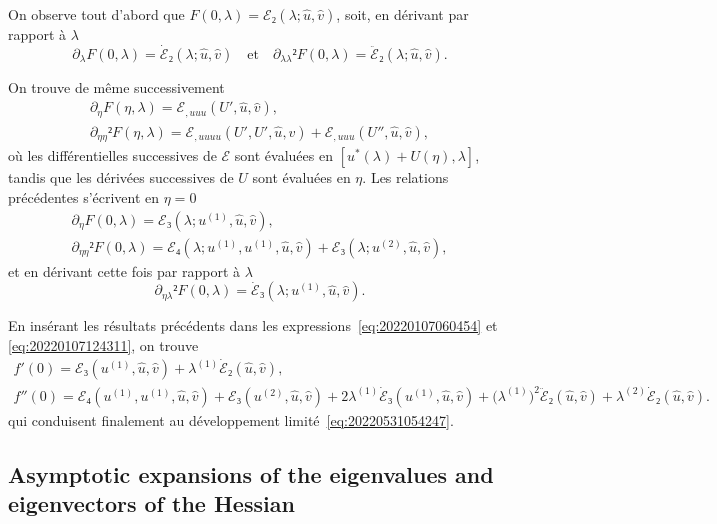 \documentclass[12pt, final]{scrartcl}
\theoremstyle{definition}
\newcommand{\order}[2][1]{#2^{(#1)}}
\begin{document}
On observe tout d'abord que \(F(0, λ) =ℰ₂(λ; \hat{u}, \hat{v})\), soit, en
dérivant par rapport à \(λ\)
\begin{equation*}
  ∂_{λ} F(0, λ) = \dot{ℰ}₂(λ; \hat{u}, \hat{v})
  \quad \text{et} \quad
  ∂_{λλ}² F(0, λ) = \ddot{ℰ}₂(λ; \hat{u}, \hat{v}).
\end{equation*}

On trouve de même successivement
\begin{gather*}
  ∂_{η} F(η, λ) = ℰ_{, uuu}(U', \hat{u}, \hat{v}),\\
  ∂_{ηη}² F(η, λ) = ℰ_{, uuuu}(U', U', \hat{u}, \hat{v}) + ℰ_{, uuu}(U'', \hat{u}, \hat{v}),
\end{gather*}
où les différentielles successives de \(ℰ\) sont évaluées en
\([u^{\ast}(λ) + U(η), λ]\), tandis que les dérivées successives de \(U\) sont
évaluées en \(η\). Les relations précédentes s'écrivent en \(η = 0\)
\begin{gather*}
  ∂_{η} F(0, λ) = ℰ₃(λ; \order[1]u, \hat{u}, \hat{v}),\\
  ∂_{ηη}² F(0, λ) = ℰ₄(λ ; \order[1]u, \order[1]u, \hat{u}, \hat{v}) + ℰ₃(λ; \order[2]u, \hat{u}, \hat{v}),
\end{gather*}
et en dérivant cette fois par rapport à \(λ\)
\begin{equation*}
  ∂_{η λ}² F(0, λ) = \dot{ℰ}₃(λ; \order[1]u, \hat{u}, \hat{v}).
\end{equation*}

En insérant les résultats précédents dans les
expressions~\eqref{eq:20220107060454} et \eqref{eq:20220107124311}, on trouve
\begin{gather*}
  f'(0) = ℰ₃(\order[1]u, \hat{u}, \hat{v}) + \order[1]λ \dot{ℰ}₂(\hat{u}, \hat{v}),\\
  f''(0) = ℰ₄(\order[1]u, \order[1]u, \hat{u}, \hat{v}) + ℰ₃(\order[2]u, \hat{u}, \hat{v}) + 2\order[1]λ \dot{ℰ}₃(\order[1]u, \hat{u}, \hat{v}) + \bigl( \order[1]λ \bigr)^2 \ddot{ℰ}₂(\hat{u}, \hat{v}) + \order[2]λ \dot{ℰ}₂(\hat{u}, \hat{v}) .
\end{gather*}
qui conduisent finalement au développement limité~\eqref{eq:20220531054247}.

\subsection{Asymptotic expansions of the eigenvalues and eigenvectors of the Hessian}
\label{sec:20220616074108}
\end{document}
